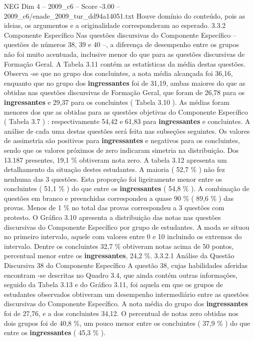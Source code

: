 \begin{textsample}{NEG Dim 4 – 2009\_c6 – Score -3.00 – 2009\_c6/enade\_2009\_tur\_dd94a14051.txt}
Houve domínio do conteúdo, pois as ideias, os argumentos e a originalidade corresponderam ao esperado. 3.3.2 Componente Específico Nas questões discursivas do Componente Específico – questões de números 38, 39 e 40 –, a diferença de desempenho entre os grupos não foi muito acentuada, inclusive menor do que para as questões discursivas de Formação Geral.
A Tabela 3.11 contém as estatísticas da média destas questões.
Observa -se que no grupo dos concluintes, a nota média alcançada foi 36,16, enquanto que no grupo dos \textbf{ingressantes} foi de 31,19, ambas maiores do que as obtidas nas questões discursivas de Formação Geral, que foram de 26,78 para os \textbf{ingressantes} e 29,37 para os concluintes ( Tabela 3.10 ).
As médias foram menores dos que as obtidas para as questões objetivas do Componente Específico ( Tabela 3.7 ) : respectivamente 54,42 e 61,83 para \textbf{ingressantes} e concluintes.
A análise de cada uma destas questões será feita nas subseções seguintes.
Os valores de assimetria são positivos para \textbf{ingressantes} e negativos para os concluintes, sendo que os valores próximos de zero indicaram simetria na distribuição.
Dos 13.187 presentes, 19,1 \% obtiveram nota zero.
A tabela 3.12 apresenta um detalhamento da situação destes estudantes.
A maioria ( 52,7 \% ) não fez nenhuma das 3 questões.
Esta proporção foi ligeiramente menor entre os concluintes ( 51,1 \% ) do que entre os \textbf{ingressantes} ( 54,8 \% ).
A combinação de questões em branco e preenchidas correspondeu a quase 90 \% ( 89,6 \% ) das provas.
Menos de 1 \% no total das provas correspondeu a 3 questões com protesto.
O Gráfico 3.10 apresenta a distribuição das notas nas questões discursivas do Componente Específico por grupo de estudantes.
A moda se situou no primeiro intervalo, aquele com valores entre 0 e 10 incluindo os extremos do intervalo.
Dentre os concluintes 32,7 \% obtiveram notas acima de 50 pontos, percentual menor entre os \textbf{ingressantes}, 24,2 \%. 3.3.2.1 Análise da Questão Discursiva 38 do Componente Específico A questão 38, cujas habilidades aferidas encontram -se descritas no Quadro 3.4, que ainda contém outras informações, seguido da Tabela 3.13 e do Gráfico 3.11, foi aquela em que os grupos de estudantes observados obtiveram um desempenho intermediário entre as questões discursivas do Componente Específico.
A nota média do grupo dos \textbf{ingressantes} foi de 27,76, e a dos concluintes 34,12.
O percentual de notas zero obtidas nos dois grupos foi de 40,8 \%, um pouco menor entre os concluintes ( 37,9 \% ) do que entre os \textbf{ingressantes} ( 45,3 \% ).

\end{textsample}
